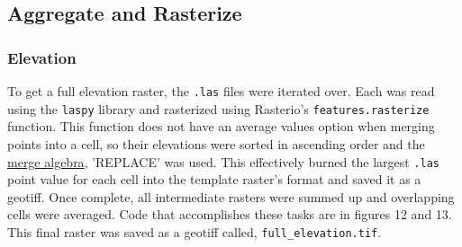 \documentclass[article,12pt]{article}
\numberwithin{equation}{section}
\begin{document}
\subsection{Aggregate and Rasterize}

\subsubsection{Elevation}

To get a full elevation raster, the \texttt{.las} files were iterated over. Each was read using the \texttt{laspy} library and rasterized using Rasterio's \texttt{features.rasterize} function. This function does not have an average values option when merging points into a cell, so their elevations were sorted in ascending order and the \href{https://rasterio.readthedocs.io/en/latest/api/rasterio.enums.html#rasterio.enums.MergeAlg}{merge algebra}, 'REPLACE' was used. This effectively burned the largest \texttt{.las} point value for each cell into the template raster's format and saved it as a geotiff. Once complete, all intermediate rasters were summed up and overlapping cells were averaged. Code that accomplishes these tasks are in figures 12 and 13. This final raster was saved as a geotiff called, \texttt{full\_elevation.tif}.
\newpage
		\\
	\begin{center}
	\end{center}
\end{document}
